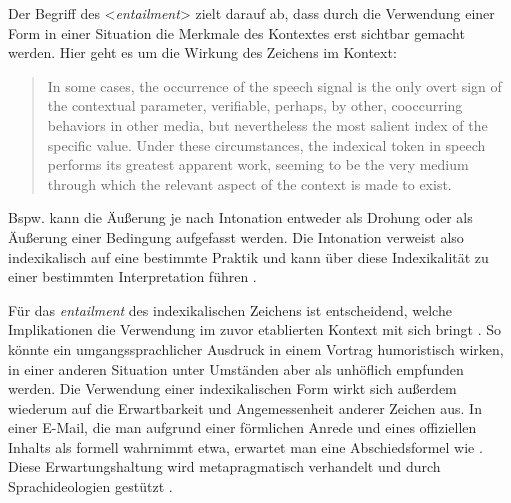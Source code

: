 Der Begriff des <\textit{entailment}> zielt darauf ab, dass durch die Verwendung einer  Form in einer Situation die Merkmale des Kontextes erst sichtbar gemacht werden. Hier geht es um die Wirkung des Zeichens im Kontext:
\begin{quote} In some cases, the occurrence of the speech signal is the only overt sign of the contextual parameter, verifiable, perhaps, by other, cooccurring behaviors in other media, but nevertheless the most salient index of the specific value. Under these circumstances, the indexical token in speech performs its greatest apparent work, seeming to be the very medium through which the relevant aspect of the context is made to \glqq exist.\grqq{} \citep[34]{Silverstein.1976}\end{quote}
Bspw. kann die Äußerung  je nach Intonation entweder als Drohung oder als Äußerung einer Bedingung aufgefasst werden. 
Die Intonation verweist also indexikalisch auf eine bestimmte Praktik und kann über diese Indexikalität zu einer bestimmten Interpretation führen \citep[s.][421]{Ochs1996}. 

Für das \textit{entailment} des indexikalischen Zeichens ist entscheidend, welche Implikationen die Verwendung im zuvor etablierten Kontext mit sich bringt \citep[s.][195]{Silverstein2003}. 
So könnte ein umgangssprachlicher Ausdruck in einem Vortrag humoristisch wirken, in einer anderen Situation unter Umständen aber als unhöflich empfunden werden. 
Die Verwendung einer indexikalischen Form wirkt sich außerdem wiederum auf die Erwartbarkeit und Angemessenheit anderer Zeichen aus. 
In einer E-Mail, die man aufgrund einer förmlichen Anrede und eines offiziellen Inhalts als formell wahrnimmt etwa, erwartet man eine Abschiedsformel wie . 
Diese Erwartungshaltung wird metapragmatisch verhandelt und durch Sprachideologien gestützt \citep[s.][196]{Silverstein2003}. 

